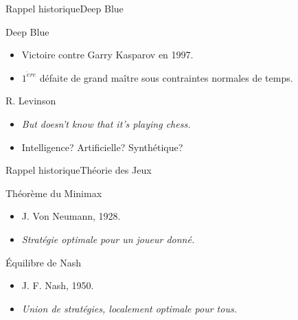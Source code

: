 
\begin{frame}{Rappel historique}{Deep Blue}

\begin{block}{Deep Blue} 
\begin{itemize}
\item Victoire contre Garry Kasparov en 1997.
\item $1^{\grave{e}re}$ défaite de grand maître sous contraintes normales de temps.
\end{itemize}
\end{block}

\pause

\begin{block}{R. Levinson} 
\begin{itemize}
\item \textit{\og But doesn't know that it's playing chess.\fg{}}
\item Intelligence? Artificielle? Synthétique?
\end{itemize}
\end{block}

\end{frame}




\begin{frame}{Rappel historique}{Théorie des Jeux}

\begin{block}{Théorème du Minimax} 
\begin{itemize}
\item J. Von Neumann, 1928.
\item \textit{Stratégie optimale pour un joueur donné.}
\end{itemize}
\end{block}

\pause

\begin{block}{Équilibre de Nash} 
\begin{itemize}
\item J. F. Nash, 1950.
\item \textit{Union de stratégies, localement optimale pour tous.}
\end{itemize}
\end{block}

\end{frame}


